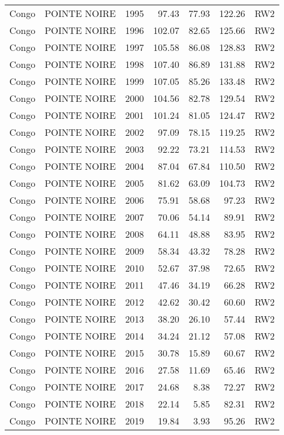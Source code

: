 \begin{longtable}{lllrrrl}
  Congo & POINTE NOIRE & 1995 & 97.43 & 77.93 & 122.26 & RW2 \\ 
  Congo & POINTE NOIRE & 1996 & 102.07 & 82.65 & 125.66 & RW2 \\ 
  Congo & POINTE NOIRE & 1997 & 105.58 & 86.08 & 128.83 & RW2 \\ 
  Congo & POINTE NOIRE & 1998 & 107.40 & 86.89 & 131.88 & RW2 \\ 
  Congo & POINTE NOIRE & 1999 & 107.05 & 85.26 & 133.48 & RW2 \\ 
  Congo & POINTE NOIRE & 2000 & 104.56 & 82.78 & 129.54 & RW2 \\ 
  Congo & POINTE NOIRE & 2001 & 101.24 & 81.05 & 124.47 & RW2 \\ 
  Congo & POINTE NOIRE & 2002 & 97.09 & 78.15 & 119.25 & RW2 \\ 
  Congo & POINTE NOIRE & 2003 & 92.22 & 73.21 & 114.53 & RW2 \\ 
  Congo & POINTE NOIRE & 2004 & 87.04 & 67.84 & 110.50 & RW2 \\ 
  Congo & POINTE NOIRE & 2005 & 81.62 & 63.09 & 104.73 & RW2 \\ 
  Congo & POINTE NOIRE & 2006 & 75.91 & 58.68 & 97.23 & RW2 \\ 
  Congo & POINTE NOIRE & 2007 & 70.06 & 54.14 & 89.91 & RW2 \\ 
  Congo & POINTE NOIRE & 2008 & 64.11 & 48.88 & 83.95 & RW2 \\ 
  Congo & POINTE NOIRE & 2009 & 58.34 & 43.32 & 78.28 & RW2 \\ 
  Congo & POINTE NOIRE & 2010 & 52.67 & 37.98 & 72.65 & RW2 \\ 
  Congo & POINTE NOIRE & 2011 & 47.46 & 34.19 & 66.28 & RW2 \\ 
  Congo & POINTE NOIRE & 2012 & 42.62 & 30.42 & 60.60 & RW2 \\ 
  Congo & POINTE NOIRE & 2013 & 38.20 & 26.10 & 57.44 & RW2 \\ 
  Congo & POINTE NOIRE & 2014 & 34.24 & 21.12 & 57.08 & RW2 \\ 
  Congo & POINTE NOIRE & 2015 & 30.78 & 15.89 & 60.67 & RW2 \\ 
  Congo & POINTE NOIRE & 2016 & 27.58 & 11.69 & 65.46 & RW2 \\ 
  Congo & POINTE NOIRE & 2017 & 24.68 & 8.38 & 72.27 & RW2 \\ 
  Congo & POINTE NOIRE & 2018 & 22.14 & 5.85 & 82.31 & RW2 \\ 
  Congo & POINTE NOIRE & 2019 & 19.84 & 3.93 & 95.26 & RW2 \\ 

\end{longtable}
